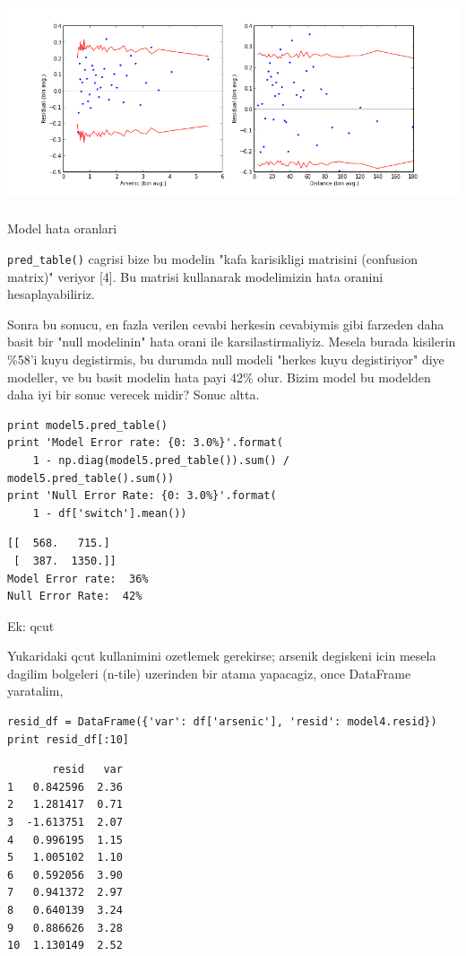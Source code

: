 \documentclass[12pt,fleqn]{article}\usepackage{../common}
\begin{document}
\includegraphics[height=6cm]{wells_4.png}

Model hata oranlari

\verb!pred_table()! cagrisi bize bu modelin "kafa karisikligi matrisini
(confusion matrix)" veriyor [4]. Bu matrisi kullanarak modelimizin hata
oranini hesaplayabiliriz.

Sonra bu sonucu, en fazla verilen cevabi herkesin cevabiymis gibi
farzeden daha basit bir "null modelinin" hata orani ile
karsilastirmaliyiz. Mesela burada kisilerin \%58'i kuyu degistirmis, bu
durumda null modeli "herkes kuyu degistiriyor" diye modeller, ve bu
basit modelin hata payi 42\% olur. Bizim model bu modelden daha iyi
bir sonuc verecek midir? Sonuc altta.

\begin{verbatim}
print model5.pred_table()
print 'Model Error rate: {0: 3.0%}'.format(
    1 - np.diag(model5.pred_table()).sum() / model5.pred_table().sum())
print 'Null Error Rate: {0: 3.0%}'.format(
    1 - df['switch'].mean())
\end{verbatim}

\begin{verbatim}
[[  568.   715.]
 [  387.  1350.]]
Model Error rate:  36%
Null Error Rate:  42%
\end{verbatim}

Ek: qcut

Yukaridaki qcut kullanimini ozetlemek gerekirse; arsenik degiskeni
icin mesela dagilim bolgeleri (n-tile) uzerinden bir atama yapacagiz,
once DataFrame yaratalim,

\begin{verbatim}
resid_df = DataFrame({'var': df['arsenic'], 'resid': model4.resid})
print resid_df[:10]
\end{verbatim}

\begin{verbatim}
       resid   var
1   0.842596  2.36
2   1.281417  0.71
3  -1.613751  2.07
4   0.996195  1.15
5   1.005102  1.10
6   0.592056  3.90
7   0.941372  2.97
8   0.640139  3.24
9   0.886626  3.28
10  1.130149  2.52
\end{verbatim}
\end{document}
